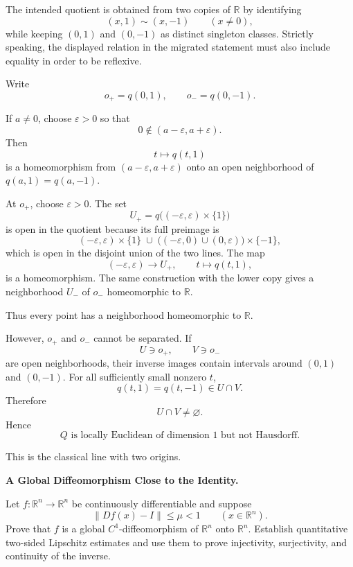 \begin{solution}
The intended quotient is obtained from two copies of \(\mathbb R\) by identifying
\[
(x,1)\sim(x,-1)
\qquad(x\neq0),
\]
while keeping \((0,1)\) and \((0,-1)\) as distinct singleton classes. Strictly speaking, the displayed relation in the migrated statement must also include equality in order to be reflexive.

Write
\[
o_+=q(0,1),
\qquad
o_-=q(0,-1).
\]

If \(a\neq0\), choose \(\varepsilon>0\) so that
\[
0\notin(a-\varepsilon,a+\varepsilon).
\]
Then
\[
t\longmapsto q(t,1)
\]
is a homeomorphism from \((a-\varepsilon,a+\varepsilon)\) onto an open neighborhood of \(q(a,1)=q(a,-1)\).

At \(o_+\), choose \(\varepsilon>0\). The set
\[
U_+
=
q\big((-\varepsilon,\varepsilon)\times\{1\}\big)
\]
is open in the quotient because its full preimage is
\[
(-\varepsilon,\varepsilon)\times\{1\}
\;\cup\;
\big((-\varepsilon,0)\cup(0,\varepsilon)\big)\times\{-1\},
\]
which is open in the disjoint union of the two lines. The map
\[
(-\varepsilon,\varepsilon)\to U_+,
\qquad
t\mapsto q(t,1),
\]
is a homeomorphism. The same construction with the lower copy gives a neighborhood \(U_-\) of \(o_-\) homeomorphic to \(\mathbb R\).

Thus every point has a neighborhood homeomorphic to \(\mathbb R\).

However, \(o_+\) and \(o_-\) cannot be separated. If
\[
U\ni o_+,
\qquad
V\ni o_-
\]
are open neighborhoods, their inverse images contain intervals around \((0,1)\) and \((0,-1)\). For all sufficiently small nonzero \(t\),
\[
q(t,1)=q(t,-1)\in U\cap V.
\]
Therefore
\[
U\cap V\neq\varnothing.
\]
Hence
\[
\boxed{Q\text{ is locally Euclidean of dimension }1\text{ but not Hausdorff}.}
\]

This is the classical line with two origins.
\end{solution}


\begin{problem}[CP-II-0100]
\label{prob:cp-ii-0100}
\textbf{A Global Diffeomorphism Close to the Identity.}

\hspace*{1.5em}Let \(f:\mathbb R^n\to\mathbb R^n\) be continuously differentiable and suppose
\[
\|Df(x)-I\|\le\mu<1
\qquad(x\in\mathbb R^n).
\]
Prove that \(f\) is a global \(C^1\)-diffeomorphism of \(\mathbb R^n\) onto
\(\mathbb R^n\). Establish quantitative two-sided Lipschitz estimates and use
them to prove injectivity, surjectivity, and continuity of the inverse.
\end{problem}

